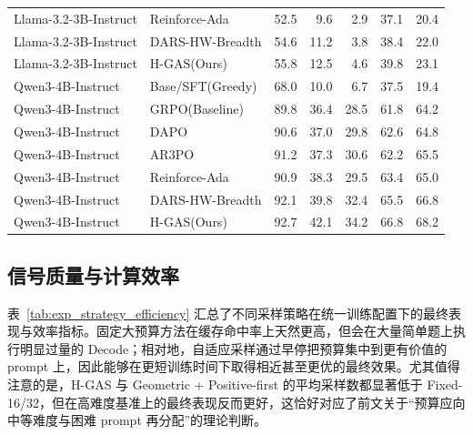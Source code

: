 \begin{table}[!htbp]
{\begin{tabular}{llrrrrr}
        Llama-3.2-3B-Instruct & Reinforce-Ada & 52.5 & 9.6 & 2.9 & 37.1 & 20.4 \\
        Llama-3.2-3B-Instruct & DARS-HW-Breadth & 54.6 & 11.2 & 3.8 & 38.4 & 22.0 \\
        Llama-3.2-3B-Instruct & H-GAS(Ours) & 55.8 & 12.5 & 4.6 & 39.8 & 23.1 \\
        \hline
        Qwen3-4B-Instruct & Base/SFT(Greedy) & 68.0 & 10.0 & 6.7 & 37.5 & 19.4 \\
        Qwen3-4B-Instruct & GRPO(Baseline) & 89.8 & 36.4 & 28.5 & 61.8 & 64.2 \\
        Qwen3-4B-Instruct & DAPO & 90.6 & 37.0 & 29.8 & 62.6 & 64.8 \\
        Qwen3-4B-Instruct & AR3PO & 91.2 & 37.3 & 30.6 & 62.2 & 65.5 \\
        Qwen3-4B-Instruct & Reinforce-Ada & 90.9 & 38.3 & 29.5 & 63.4 & 65.0 \\
        Qwen3-4B-Instruct & DARS-HW-Breadth & 92.1 & 39.8 & 32.4 & 65.5 & 66.8 \\
        Qwen3-4B-Instruct & H-GAS(Ours) & 92.7 & 42.1 & 34.2 & 66.8 & 68.2 \\
        \hline
    \end{tabular}%
    }
\end{table}

\subsection{信号质量与计算效率}

表~\ref{tab:exp_strategy_efficiency} 汇总了不同采样策略在统一训练配置下的最终表现与效率指标。固定大预算方法在缓存命中率上天然更高，但会在大量简单题上执行明显过量的 Decode；相对地，自适应采样通过早停把预算集中到更有价值的 prompt 上，因此能够在更短训练时间下取得相近甚至更优的最终效果。尤其值得注意的是，H-GAS 与 Geometric + Positive-first 的平均采样数都显著低于 Fixed-16/32，但在高难度基准上的最终表现反而更好，这恰好对应了前文关于“预算应向中等难度与困难 prompt 再分配”的理论判断。

